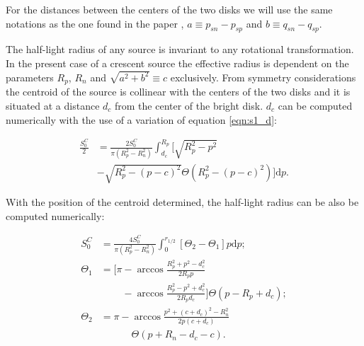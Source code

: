 \documentclass[usenatbib]{mn2e}
\begin{document}
For the distances between the centers of the two disks we will use the same 
notations as the one found in the paper \citep{2013MNRAS.434..765K}, $a \equiv p_{sn} - p_{sp}$ and $b \equiv q_{sn} - q_{sp}$.

The half-light radius of any source is invariant to any rotational transformation. 
In the present case of a crescent source the effective radius is dependent on the 
parameters $R_p$, $R_n$ and $\sqrt{a^2+b^2}\equiv c $ exclusively. From symmetry
considerations the centroid of the source is collinear with the centers of the two disks 
and it is situated at a distance $d_c$ from the center of the bright disk. $d_c$ can be 
computed numerically with the use of a variation of equation \ref{eqn:s1_d}:

\begin{equation}
\begin{aligned}
\frac{S_0^C}{2} & = \frac{2 S_0^C}{\pi \left(R_p^2-R_n^2 \right)} \int_{d_c}^{R_p} \bigg[ \sqrt{R_p^2 - p^2} \\ 
        & - \sqrt{R_p^2 - \left(p-c\right)^2} \Theta \left(R_p^2 - \left(p-c\right)^2 \right) \bigg] \mathrm{d}p. 
\end{aligned}
\end{equation}   

With the position of the centroid determined, the half-light radius can be also be computed numerically:
 
\begin{equation}
\begin{aligned}
S_0^C &=  \frac{4S_0^C}{\pi \left(R_p^2-R_n^2 \right)} \int_{0}^{r_{1/2}} \left[ \Theta_2  - \Theta_1  \right] p \mathrm{d}p; \\
\Theta_1 &= \bigg[ \pi - \arccos \frac{R_p^2 + p^2 -d_c^2}{2 R_p p} \\
         & \phantom{= \bigg[ \pi} - \arccos \frac{R_p^2 - p^2 + d_c^2}{2 R_p d_c}
            \bigg] \Theta \left( p - R_p + d_c \right); \\
\Theta_2 &=  \pi - \arccos \frac{ p^2  + (c+d_c)^2 - R_n^2}
                                {2 p \left(c + d_c \right)} \\
         & \phantom{= \pi - } \Theta \left( p + R_n - d_c -c \right). 
\end{aligned}
\end{equation}
\end{document}
